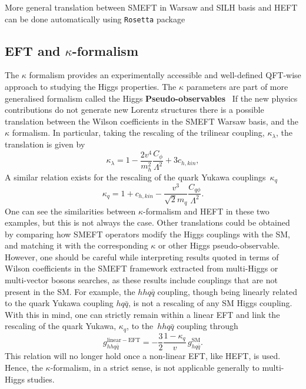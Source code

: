 More general translation between SMEFT in Warsaw and SILH basis and HEFT can be done automatically using \texttt{Rosetta} package~\cite{Falkowski:2015wza}
\subsection{EFT and $\kappa$-formalism \label{eftkappa}}
The $\kappa$ formalism provides an experimentally accessible and well-defined QFT-wise approach to studying the Higgs properties. The $\kappa$ parameters are part of more generalised formalism called the Higgs \textbf{Pseudo-observables}~\cite{Gonzalez-Alonso:2014eva} 
 If the new physics contributions do not generate new Lorentz structures there is a possible translation between the Wilson coefficients in the SMEFT Warsaw basis, and the $\kappa$ formalism. In particular, taking the rescaling of the trilinear coupling, $\kappa_\lambda$, the translation is given by
 \begin{equation}
	     \kappa_\lambda = 1-\frac{2v^4}{m_h^2} \frac{C_\phi}{\Lambda^2}+3 c_{h,kin},
	 \end{equation}
 A similar relation exists for the rescaling of the quark Yukawa couplings~$\kappa_q$
 \begin{equation}
	   \kappa_q = 1+c_{h,kin}- \frac{v^3}{\sqrt{2}m_q}\frac{C_{q\phi}}{\Lambda^2}.
	 \end{equation}
One can see the similarities between $\kappa$-formalism and HEFT in these two examples, but this is not always the case.  Other translations could be obtained by comparing how SMEFT operators modify the Higgs couplings with the SM, and matching it with the corresponding $\kappa$ or other Higgs pseudo-observable.\\ 
 However, one should be careful while interpreting results quoted in terms of Wilson coefficients in the SMEFT framework extracted from multi-Higgs or multi-vector bosons searches, as these results include couplings that are not present in the SM. For example, the $hh q\bar{q}$ coupling, though being linearly related to the quark Yukawa coupling $h q\bar{q}$, is not a rescaling of any SM Higgs coupling. With this in mind, one can strictly remain within a linear EFT and link the rescaling of the quark Yukawa, $\kappa_q$, to the~$hh q\bar{q}$ coupling through
 \begin{equation}
	   g_{hhq\bar{q}}^{\mathrm{linear-EFT}} = -\frac{3}{2}\frac{1-\kappa_q}{v} \, g_{h q\bar{q}}^{\mathrm{SM}}.
	 \end{equation}
 This relation will no longer hold once a non-linear EFT, like HEFT, is used. Hence, the $\kappa$-formalism, in a strict sense, is not applicable generally to multi-Higgs studies.
